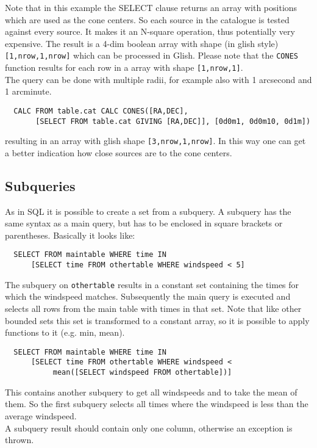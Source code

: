 Note that in this example the SELECT clause returns an array with positions
which are used as the cone centers. So each source in the catalogue is
tested against every source. It makes it an N-square operation, thus
potentially very expensive.
The result is a 4-dim boolean array with shape (in glish style)
\texttt{[1,nrow,1,nrow]} which can be processed in Glish. Please note
that the \texttt{CONES} function results for 
each row in a array with shape \texttt{[1,nrow,1]}.
\\The query can be done with multiple radii, for example also
with 1 arcsecond and 1 arcminute.
\begin{verbatim}
  CALC FROM table.cat CALC CONES([RA,DEC],
       [SELECT FROM table.cat GIVING [RA,DEC]], [0d0m1, 0d0m10, 0d1m])
\end{verbatim}
resulting in an array with glish shape \texttt{[3,nrow,1,nrow]}.
In this way one can get a better indication how close sources are to
the cone centers.

\subsection{\label{TAQL:SUBQUERIES}Subqueries}
As in SQL it is possible to create a set from a subquery. A
subquery has the same syntax as a main query, but has to be
enclosed in square brackets or parentheses. Basically it looks like:
\begin{verbatim}
  SELECT FROM maintable WHERE time IN
      [SELECT time FROM othertable WHERE windspeed < 5]
\end{verbatim}
The subquery on \texttt{othertable} results in a constant set
containing the times
for which the windspeed matches. Subsequently the main query
is executed and selects all rows from the main table with times in
that set.
Note that like other bounded sets this set is transformed to a
constant array, so it is possible to apply functions to it (e.g. min, mean).
\begin{verbatim}
  SELECT FROM maintable WHERE time IN
      [SELECT time FROM othertable WHERE windspeed <
           mean([SELECT windspeed FROM othertable])]
\end{verbatim}
This contains another subquery to get all windspeeds and
to take the mean of them. So the first subquery selects all times
where the windspeed is less than the average windspeed.
\\A subquery result should contain only one column, otherwise
an exception is thrown.

